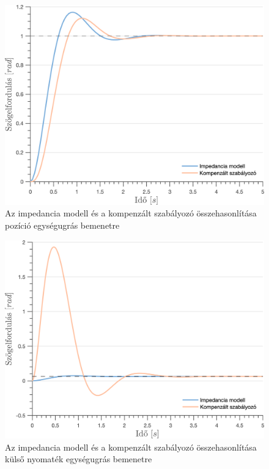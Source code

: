 \begin{figure}[ht]
    \begin{center}
    \includegraphics[width=\textwidth]{images/observer_controller_pos_resp_direct_comp.png}
    \caption{Az impedancia modell és a kompenzált szabályozó összehasonlítása pozíció egységugrás bemenetre}\label{fig:observer_controller_pos_resp_direct}
    \end{center}
\end{figure}

\begin{figure}[ht]
    \begin{center}
    \includegraphics[width=\textwidth]{images/observer_controller_torque_resp_direct_comp.png}
    \caption{Az impedancia modell és a kompenzált szabályozó összehasonlítása külső nyomaték egységugrás bemenetre}\label{fig:observer_controller_torque_resp_direct}
    \end{center}
\end{figure}



